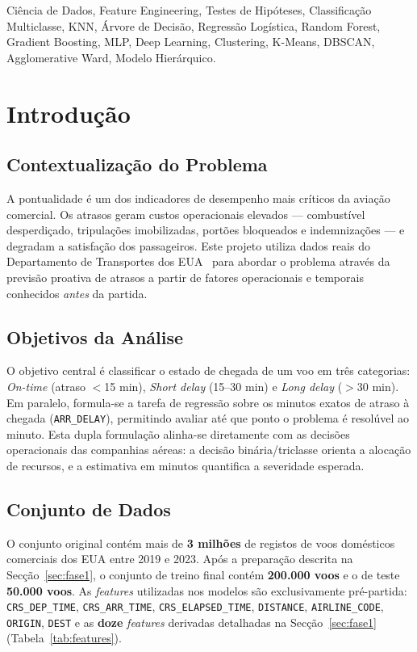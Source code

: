 \documentclass[conference]{IEEEtran}
\begin{document}
\begin{IEEEkeywords}
Ciência de Dados, Feature Engineering, Testes de Hipóteses, Classificação
Multiclasse, KNN, Árvore de Decisão, Regressão Logística, Random Forest,
Gradient Boosting, MLP, Deep Learning, Clustering, K-Means, DBSCAN,
Agglomerative Ward, Modelo Hierárquico.
\end{IEEEkeywords}

\section{Introdução}

\subsection{Contextualização do Problema}
A pontualidade é um dos indicadores de desempenho mais críticos da aviação
comercial. Os atrasos geram custos operacionais elevados — combustível
desperdiçado, tripulações imobilizadas, portões bloqueados e indemnizações —
e degradam a satisfação dos passageiros. Este projeto utiliza dados reais do
Departamento de Transportes dos EUA~\cite{dataset} para abordar o problema
através da previsão proativa de atrasos a partir de fatores operacionais e
temporais conhecidos \emph{antes} da partida.

\subsection{Objetivos da Análise}
O objetivo central é classificar o estado de chegada de um voo em três
categorias: \textit{On-time} (atraso $<$15 min), \textit{Short delay} (15–30
min) e \textit{Long delay} ($>$30 min). Em paralelo, formula-se a tarefa de
regressão sobre os minutos exatos de atraso à chegada (\texttt{ARR\_DELAY}),
permitindo avaliar até que ponto o problema é resolúvel ao minuto. Esta dupla
formulação alinha-se diretamente com as decisões operacionais das companhias
aéreas: a decisão binária/triclasse orienta a alocação de recursos, e a
estimativa em minutos quantifica a severidade esperada.

\subsection{Conjunto de Dados}
O conjunto original contém mais de \textbf{3 milhões} de registos de voos
domésticos comerciais dos EUA entre 2019 e 2023. Após a preparação descrita
na Secção~\ref{sec:fase1}, o conjunto de treino final contém \textbf{200.000
voos} e o de teste \textbf{50.000 voos}. As \textit{features} utilizadas nos
modelos são exclusivamente pré-partida: \texttt{CRS\_DEP\_TIME},
\texttt{CRS\_ARR\_TIME}, \texttt{CRS\_ELAPSED\_TIME}, \texttt{DISTANCE},
\texttt{AIRLINE\_CODE}, \texttt{ORIGIN}, \texttt{DEST} e as \textbf{doze}
\textit{features} derivadas detalhadas na Secção~\ref{sec:fase1}
(Tabela~\ref{tab:features}).
\end{document}
